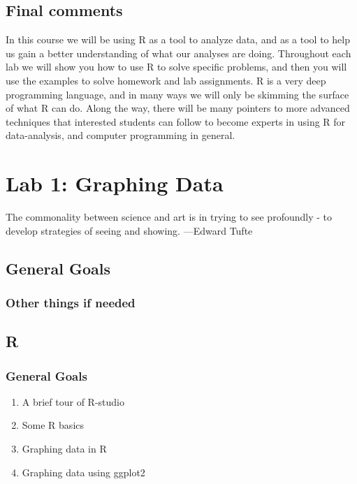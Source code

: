 \documentclass[]{book}
\providecommand{\tightlist}{%
  \setlength{\itemsep}{0pt}\setlength{\parskip}{0pt}}
\theoremstyle{definition}
\theoremstyle{definition}
\theoremstyle{definition}
\theoremstyle{remark}
\begin{document}
\section{Final comments}\label{final-comments}

In this course we will be using R as a tool to analyze data, and as a
tool to help us gain a better understanding of what our analyses are
doing. Throughout each lab we will show you how to use R to solve
specific problems, and then you will use the examples to solve homework
and lab assignments. R is a very deep programming language, and in many
ways we will only be skimming the surface of what R can do. Along the
way, there will be many pointers to more advanced techniques that
interested students can follow to become experts in using R for
data-analysis, and computer programming in general.

\chapter{Lab 1: Graphing Data}\label{lab-1-graphing-data}

{ The commonality between science and art is in trying to see profoundly
- to develop strategies of seeing and showing. ---Edward Tufte }

\section{General Goals}\label{general-goals}

\subsection{Other things if needed}\label{other-things-if-needed}

\section{R}\label{r-1}

\subsection{General Goals}\label{general-goals-1}

\begin{enumerate}
\def\labelenumi{\arabic{enumi}.}
\tightlist
\item
  A brief tour of R-studio
\item
  Some R basics
\item
  Graphing data in R
\item
  Graphing data using ggplot2
\end{enumerate}
\end{document}
